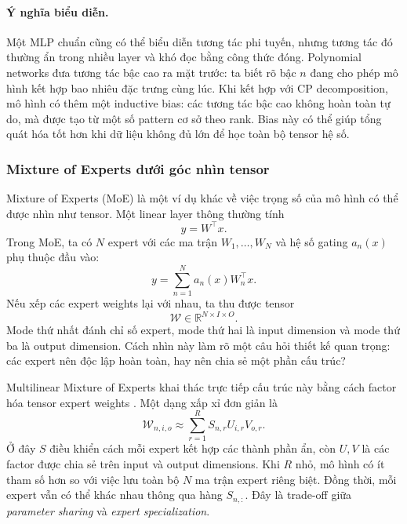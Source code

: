 \paragraph{Ý nghĩa biểu diễn.}
Một MLP chuẩn cũng có thể biểu diễn tương tác phi tuyến, nhưng tương tác đó thường ẩn
trong nhiều layer và khó đọc bằng công thức đóng. Polynomial networks đưa tương tác
bậc cao ra mặt trước: ta biết rõ bậc $n$ đang cho phép mô hình kết hợp bao nhiêu đặc
trưng cùng lúc. Khi kết hợp với CP decomposition, mô hình có thêm một inductive bias:
các tương tác bậc cao không hoàn toàn tự do, mà được tạo từ một số pattern cơ sở theo
rank. Bias này có thể giúp tổng quát hóa tốt hơn khi dữ liệu không đủ lớn để học toàn
bộ tensor hệ số.

\subsubsection{Mixture of Experts dưới góc nhìn tensor}

Mixture of Experts (MoE) là một ví dụ khác về việc trọng số của mô hình có thể được
nhìn như tensor. Một linear layer thông thường tính
\begin{equation}
    y = W^\top x.
\end{equation}
Trong MoE, ta có $N$ expert với các ma trận $W_1,\ldots,W_N$ và hệ số gating
$a_n(x)$ phụ thuộc đầu vào:
\begin{equation}
    y = \sum_{n=1}^{N} a_n(x) W_n^\top x.
    \label{eq:moe-standard}
\end{equation}
Nếu xếp các expert weights lại với nhau, ta thu được tensor
\begin{equation}
    \mathcal{W} \in \mathbb{R}^{N \times I \times O}.
    \label{eq:moe-weight-tensor}
\end{equation}
Mode thứ nhất đánh chỉ số expert, mode thứ hai là input dimension và mode thứ ba là
output dimension. Cách nhìn này làm rõ một câu hỏi thiết kế quan trọng: các expert nên
độc lập hoàn toàn, hay nên chia sẻ một phần cấu trúc?

Multilinear Mixture of Experts khai thác trực tiếp cấu trúc này bằng cách factor hóa
tensor expert weights \cite{oldfield2024multilinear}. Một dạng xấp xỉ đơn giản là
\begin{equation}
    \mathcal{W}_{n,i,o}
    \approx
    \sum_{r=1}^{R}
    S_{n,r} U_{i,r} V_{o,r}.
    \label{eq:factorized-moe}
\end{equation}
Ở đây $S$ điều khiển cách mỗi expert kết hợp các thành phần ẩn, còn $U,V$ là các factor
được chia sẻ trên input và output dimensions. Khi $R$ nhỏ, mô hình có ít tham số hơn
so với việc lưu toàn bộ $N$ ma trận expert riêng biệt. Đồng thời, mỗi expert vẫn có thể
khác nhau thông qua hàng $S_{n,:}$. Đây là trade-off giữa \emph{parameter sharing} và
\emph{expert specialization}.

